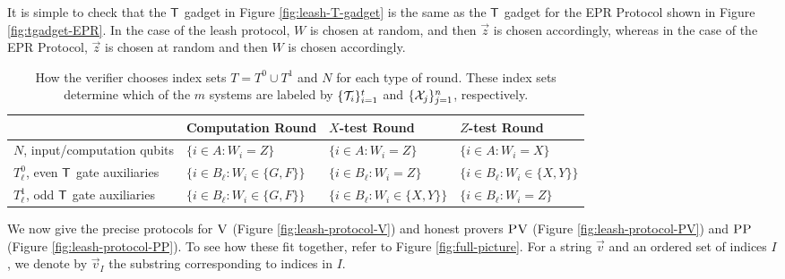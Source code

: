 \documentclass[11pt,letter]{article}
\theoremstyle{remark}
\theoremstyle{definition}
\newcommand{\ver}{\textsc{V}}
\newcommand{\pv}{\textsc{PV}}
\newcommand{\pp}{\textsc{PP}}
\begin{document}
It is simple to check that the $\sf T$ gadget in Figure \ref{fig:leash-T-gadget} is the same as the $\sf T$ gadget for the EPR Protocol shown in Figure \ref{fig:tgadget-EPR}. In the case of the leash protocol, $W$ is chosen at random, and then $\vec{z}$ is chosen accordingly, whereas in the case of the EPR Protocol, $\vec{z}$ is chosen at random and then $W$ is chosen accordingly. 




\begin{table}
\centering
\setlength\tabcolsep{1.5pt}
\begin{tabular}{|l|lll|}
\hline
& Computation Round & $X$-test Round & $Z$-test Round\\
\hline
$N$, input/computation qubits & $\{i\in A:W_i=Z\}$ & $\{i\in A:W_i=Z\}$ & $\{i\in A:W_i=X\}$\\
$T^0_{\ell}$, even $\sf T$ gate auxiliaries & $\{i\in B_{\ell}:W_i\in \{G,F\}\}$ & $\{i\in B_{\ell}:W_i=Z\}$ & $\{i\in B_{\ell}:W_i\in \{X,Y\}\}$ \\
$T^1_{\ell}$, odd $\sf T$ gate auxiliaries & $\{i\in B_{\ell}:W_i\in \{G,F\}\}$ & $\{i\in B_{\ell}:W_i\in \{X,Y\}\}$ & $\{i\in B_{\ell}:W_i=Z\}$ \\
\hline
\end{tabular}
\caption{How the verifier chooses index sets $T=T^0\cup T^1$ and $N$ for each type of round. These index sets determine which of the $m$ systems are labeled by $\{{\cal T}_{i}\}_{i=1}^t$ and $\{{\cal X}_{j}\}_{j=1}^n$, respectively.}\label{tab:index-choices}
\end{table}

We now give the precise protocols for $\ver$ (Figure \ref{fig:leash-protocol-V}) and honest provers $\pv$ (Figure \ref{fig:leash-protocol-PV}) and $\pp$ (Figure \ref{fig:leash-protocol-PP}). To see how these fit together, refer to Figure \ref{fig:full-picture}. For a string $\vec{v}$ and an ordered set of indices $I$, we denote by $\vec{v}_I$ the substring corresponding to indices in $I$.
\end{document}
